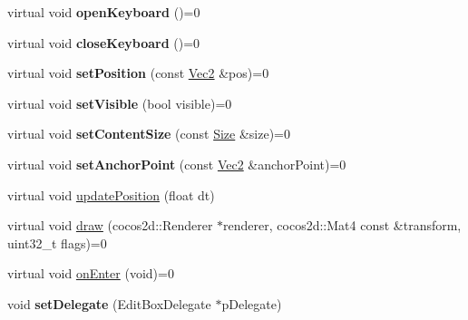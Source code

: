 \begin{DoxyCompactItemize}
\item 
\mbox{\label{classcocos2d_1_1ui_1_1EditBoxImpl_a42acfa5bb050f8559c46ca2299ba7231}} 
virtual void {\bfseries open\+Keyboard} ()=0
\item 
\mbox{\label{classcocos2d_1_1ui_1_1EditBoxImpl_a65d1e72ced3fc3934b64eaa9df577fdc}} 
virtual void {\bfseries close\+Keyboard} ()=0
\item 
\mbox{\label{classcocos2d_1_1ui_1_1EditBoxImpl_ae59460980a1f9e4adffaecb1b288c37f}} 
virtual void {\bfseries set\+Position} (const \hyperlink{classVec2}{Vec2} \&pos)=0
\item 
\mbox{\label{classcocos2d_1_1ui_1_1EditBoxImpl_a5871253fefc6807290f0fa545ab6220d}} 
virtual void {\bfseries set\+Visible} (bool visible)=0
\item 
\mbox{\label{classcocos2d_1_1ui_1_1EditBoxImpl_a247dd5f0022c937487b5191335090a90}} 
virtual void {\bfseries set\+Content\+Size} (const \hyperlink{classSize}{Size} \&size)=0
\item 
\mbox{\label{classcocos2d_1_1ui_1_1EditBoxImpl_a03039c4d52261006310386b0095c8aba}} 
virtual void {\bfseries set\+Anchor\+Point} (const \hyperlink{classVec2}{Vec2} \&anchor\+Point)=0
\item 
virtual void \hyperlink{classcocos2d_1_1ui_1_1EditBoxImpl_a3ec4de1b40e67defdccbdec284838762}{update\+Position} (float dt)
\item 
virtual void \hyperlink{classcocos2d_1_1ui_1_1EditBoxImpl_ada62d5295e06cf1be160490b89e8ac67}{draw} (cocos2d\+::\+Renderer $\ast$renderer, cocos2d\+::\+Mat4 const \&transform, uint32\+\_\+t flags)=0
\item 
virtual void \hyperlink{classcocos2d_1_1ui_1_1EditBoxImpl_a8f9cda6f24211a5fcbcb540c256ef6e6}{on\+Enter} (void)=0
\item 
\mbox{\label{classcocos2d_1_1ui_1_1EditBoxImpl_acfc392328fdff25f7dff85034af123a3}} 
void {\bfseries set\+Delegate} (Edit\+Box\+Delegate $\ast$p\+Delegate)
\item 
\mbox{\label{classcocos2d_1_1ui_1_1EditBoxImpl_a59a35c4754b30c308a3433797e0b10b9}} 

\end{DoxyCompactItemize}
